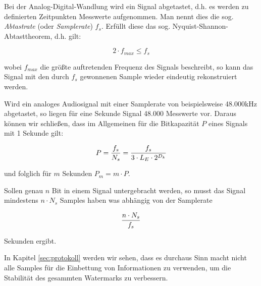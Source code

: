Bei der Analog-Digital-Wandlung wird ein Signal abgetastet, d.h. es werden zu definierten Zeitpunkten Messwerte aufgenommen. Man nennt dies die sog. \textit{Abtastrate} (oder \textit{Samplerate}) $f_s$. Erfüllt diese das sog. Nyquist-Shannon-Abtasttheorem\cite{shannon1949communication}, d.h. gilt: 

	 \begin{equation}
		 2 \cdot f_{max} \leq f_s
	 	\label{equ:abtasttheorem}
	 \end{equation}
	
wobei ${f}_{max}$ die größte auftretenden Frequenz des Signals beschreibt, so kann das Signal mit den durch $f_s$ gewonnenen Sample wieder eindeutig rekonstruiert werden.

Wird ein analoges Audiosignal mit einer Samplerate von beispielsweise 48.000kHz abgetastet, so liegen für eine Sekunde Signal 48.000 Messwerte vor. Daraus können wir schließen, dass im Allgemeinen für die Bitkapazität $P$ eines Signals mit 1 Sekunde gilt: 

	 \begin{equation}
		 P = { {f}_{s} \over N_s } = { {f}_{s} \over 3 \cdot {L}_{E} \cdot 2 ^ {{D}_{k}} }
	 	\label{equ:bitcapacity_1sec}
	 \end{equation}

und folglich für $m$ Sekunden ${P}_{m} = m \cdot P$. 

Sollen genau $n$ Bit in einem Signal untergebracht werden, so musst das Signal mindestens $n \cdot {N}_{s}$ Samples haben was abhängig von der Samplerate

	 \begin{equation}
		 { n \cdot {N}_{s} \over {f}_{s} }
	 	\label{equ:bitcapacity_seconds}
	 \end{equation}
	 
Sekunden ergibt. 

In Kapitel \ref{sec:protokoll} werden wir sehen, dass es durchaus Sinn macht nicht alle Samples für die Einbettung von Informationen zu verwenden, um die Stabilität des gesammten Watermarks zu verbessern. 






